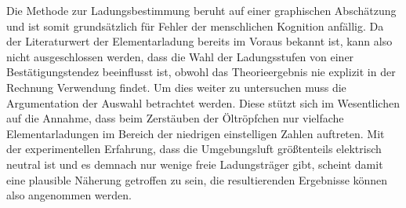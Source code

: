 Die Methode zur Ladungsbestimmung beruht auf einer graphischen Abschätzung und ist somit grundsätzlich für Fehler der menschlichen Kognition
anfällig. Da der Literaturwert der Elementarladung bereits im Voraus bekannt ist, kann also nicht ausgeschlossen werden, dass die Wahl der
Ladungsstufen von einer Bestätigungstendez beeinflusst ist, obwohl das Theorieergebnis nie explizit in der Rechnung Verwendung findet. Um
dies weiter zu untersuchen muss die Argumentation der Auswahl betrachtet werden. Diese stützt sich im Wesentlichen auf die Annahme, dass
beim Zerstäuben der Öltröpfchen nur vielfache Elementarladungen im Bereich der niedrigen einstelligen Zahlen auftreten. Mit der experimentellen
Erfahrung, dass die Umgebungsluft größtenteils elektrisch neutral ist und es demnach nur wenige freie Ladungsträger gibt, scheint damit
eine plausible Näherung getroffen zu sein, die resultierenden Ergebnisse können also angenommen werden.

\newpage
